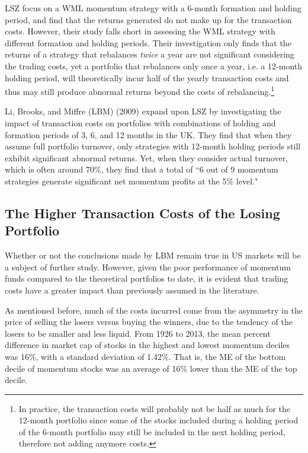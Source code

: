 \documentclass[12pt]{article}
\begin{document}
LSZ focus on a WML momentum strategy with a 6-month formation and holding period, and find that the returns generated do not make up for the transaction costs. However, their study falls short in assessing the WML strategy with different formation and holding periods. Their investigation only finds that the returns of a strategy that rebalances \emph{twice} a year are not significant considering the trading costs, yet a portfolio that rebalances only once a year, i.e. a 12-month holding period, will theoretically incur half of the yearly transaction costs and thus may still produce abnormal returns beyond the costs of rebalancing.\footnote{In practice, the transaction costs will probably not be half as much for the 12-month portfolio since some of the stocks included during a holding period of the 6-month portfolio may still be included in the next holding period, therefore not adding anymore costs.}

Li, Brooks, and Miffre (LBM) (2009) expand upon LSZ by investigating the impact of transaction costs on portfolios with combinations of holding and formation periods of 3, 6, and 12 months in the UK. They find that when they assume full portfolio turnover, only strategies with 12-month holding periods still exhibit significant abnormal returns. Yet, when they consider actual turnover, which is often around 70\%, they find that a total of ``6 out of 9 momentum strategies generate significant net momentum profits at the 5\% level." 

\subsection{The Higher Transaction Costs of the Losing Portfolio}

Whether or not the conclusions made by LBM remain true in US markets will be a subject of further study. However, given the poor performance of momentum funds compared to the theoretical portfolios to date, it is evident that trading costs have a greater impact than previously assumed in the literature.

As mentioned before, much of the costs incurred come from the asymmetry in the price of selling the losers versus buying the winners, due to the tendency of the losers to be smaller and less liquid. From 1926 to 2013, the mean percent difference in market cap of stocks in the highest and lowest momentum deciles was 16\%, with a standard deviation of 1.42\%. That is, the ME of the bottom decile of momentum stocks was an average of 16\% lower than the ME of the top decile.
\end{document}
